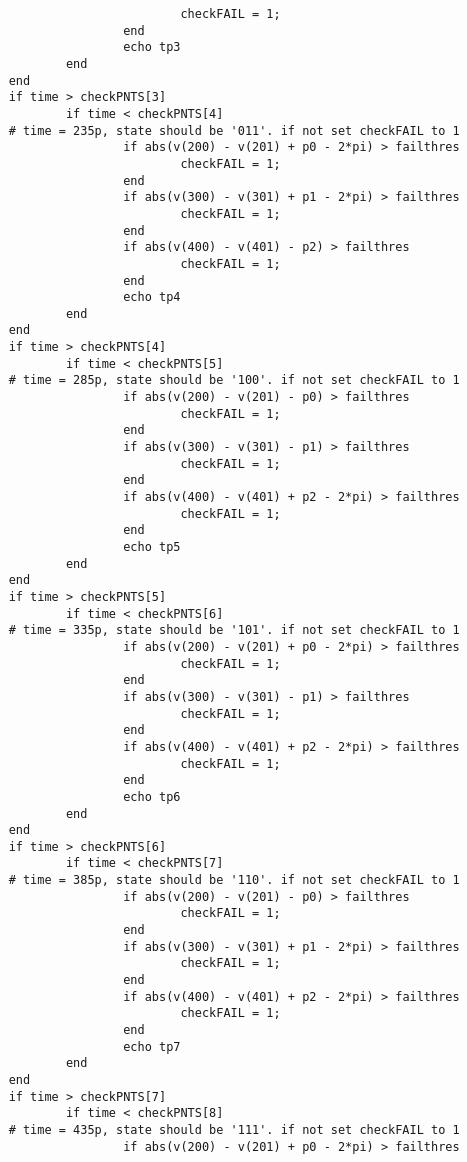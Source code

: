 \begin{verbatim}
                            checkFAIL = 1;
                    end
                    echo tp3
            end
    end
    if time > checkPNTS[3]
            if time < checkPNTS[4]
    # time = 235p, state should be '011'. if not set checkFAIL to 1
                    if abs(v(200) - v(201) + p0 - 2*pi) > failthres
                            checkFAIL = 1;
                    end
                    if abs(v(300) - v(301) + p1 - 2*pi) > failthres
                            checkFAIL = 1;
                    end
                    if abs(v(400) - v(401) - p2) > failthres
                            checkFAIL = 1;
                    end
                    echo tp4
            end
    end
    if time > checkPNTS[4]
            if time < checkPNTS[5]
    # time = 285p, state should be '100'. if not set checkFAIL to 1
                    if abs(v(200) - v(201) - p0) > failthres
                            checkFAIL = 1;
                    end
                    if abs(v(300) - v(301) - p1) > failthres
                            checkFAIL = 1;
                    end
                    if abs(v(400) - v(401) + p2 - 2*pi) > failthres
                            checkFAIL = 1;
                    end
                    echo tp5
            end
    end
    if time > checkPNTS[5]
            if time < checkPNTS[6]
    # time = 335p, state should be '101'. if not set checkFAIL to 1
                    if abs(v(200) - v(201) + p0 - 2*pi) > failthres
                            checkFAIL = 1;
                    end
                    if abs(v(300) - v(301) - p1) > failthres
                            checkFAIL = 1;
                    end
                    if abs(v(400) - v(401) + p2 - 2*pi) > failthres
                            checkFAIL = 1;
                    end
                    echo tp6
            end
    end
    if time > checkPNTS[6]
            if time < checkPNTS[7]
    # time = 385p, state should be '110'. if not set checkFAIL to 1
                    if abs(v(200) - v(201) - p0) > failthres
                            checkFAIL = 1;
                    end
                    if abs(v(300) - v(301) + p1 - 2*pi) > failthres
                            checkFAIL = 1;
                    end
                    if abs(v(400) - v(401) + p2 - 2*pi) > failthres
                            checkFAIL = 1;
                    end
                    echo tp7
            end
    end
    if time > checkPNTS[7]
            if time < checkPNTS[8]
    # time = 435p, state should be '111'. if not set checkFAIL to 1
                    if abs(v(200) - v(201) + p0 - 2*pi) > failthres

\end{verbatim}
